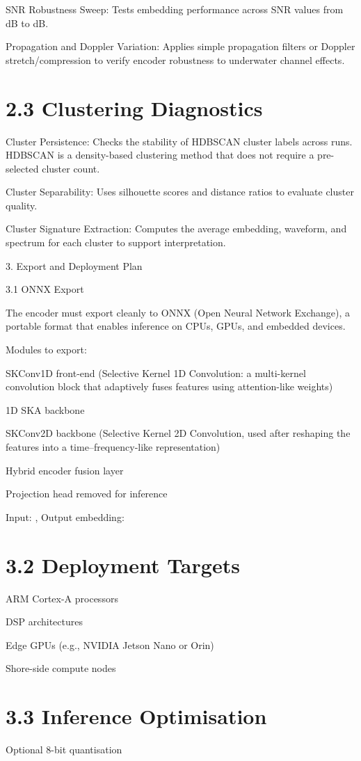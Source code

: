 \documentclass[12pt]{article}
\begin{document}
SNR Robustness Sweep: Tests embedding performance across SNR values from  dB to  dB.

Propagation and Doppler Variation: Applies simple propagation filters or Doppler stretch/compression to verify encoder robustness to underwater channel effects.

\section*{2.3 Clustering Diagnostics}
Cluster Persistence: Checks the stability of HDBSCAN cluster labels across runs. HDBSCAN is a density-based clustering method that does not require a pre-selected cluster count.

Cluster Separability: Uses silhouette scores and distance ratios to evaluate cluster quality.

Cluster Signature Extraction: Computes the average embedding, waveform, and spectrum for each cluster to support interpretation.

3. Export and Deployment Plan

3.1 ONNX Export

The encoder must export cleanly to ONNX (Open Neural Network Exchange), a portable format that enables inference on CPUs, GPUs, and embedded devices.

Modules to export:

SKConv1D front-end (Selective Kernel 1D Convolution: a multi-kernel convolution block that adaptively fuses features using attention-like weights)

1D SKA backbone

SKConv2D backbone (Selective Kernel 2D Convolution, used after reshaping the features into a time–frequency-like representation)

Hybrid encoder fusion layer

Projection head removed for inference

Input: , Output embedding:

\section*{3.2 Deployment Targets}
ARM Cortex-A processors

DSP architectures

Edge GPUs (e.g., NVIDIA Jetson Nano or Orin)

Shore-side compute nodes

\section*{3.3 Inference Optimisation}
Optional 8-bit quantisation
\end{document}
